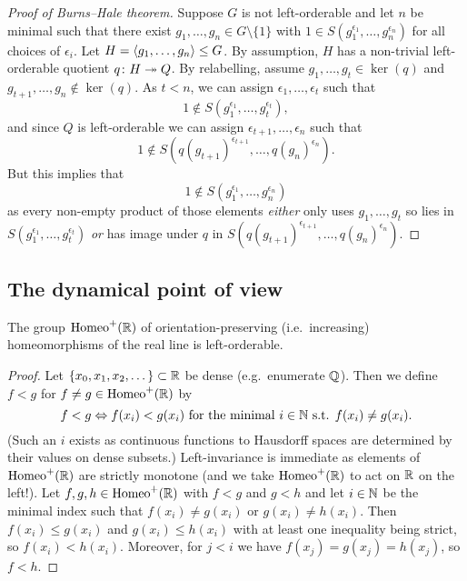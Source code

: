 \begin{proof}[Proof of Burns--Hale theorem]
    Suppose $G$ is not left-orderable and let $n$ be minimal such that there exist $g_1, \dots, g_n \in G \setminus \{1\}$ with $1 \in S(g_1^{\epsilon_1}, \dots, g_n^{\epsilon_n})$ for all choices of $\epsilon_i$.
    Let $H = \langle g_1, \dots, g_n \rangle \leq G$.
    By assumption, $H$ has a non-trivial left-orderable quotient $q \colon H \twoheadrightarrow Q$.
    By relabelling, assume $g_1, \dots, g_t \in \ker(q)$ and $g_{t+1}, \dots, g_n \notin \ker(q)$.
    As $t < n$, we can assign $\epsilon_1, \dots, \epsilon_t$ such that \[
        1 \notin S(g_1^{\epsilon_1}, \dots, g_t^{\epsilon_t}),
    \] and since $Q$ is left-orderable we can assign $\epsilon_{t+1}, \dots, \epsilon_n$ such that \[
        1 \notin S(q(g_{t+1})^{\epsilon_{t+1}}, \dots, q(g_n)^{\epsilon_n}).
    \]
    But this implies that \[
        1 \notin S(g_1^{\epsilon_1}, \dots, g_n^{\epsilon_n})
    \] as every non-empty product of those elements \emph{either} only uses $g_1, \dots, g_t$ so lies in $S(g_1^{\epsilon_1}, \dots, g_t^{\epsilon_t})$ \emph{or} has image under $q$ in $S(q(g_{t+1})^{\epsilon_{t+1}}, \dots, q(g_n)^{\epsilon_n})$.
\end{proof}

\subsection*{The dynamical point of view}

\begin{proposition}
    The group $\mathrm{Homeo}^+(\mathbb{R})$ of orientation-preserving (i.e.\ increasing) homeomorphisms of the real line is left-orderable.
\end{proposition}

\begin{proof}
    Let $\{x_0, x_1, x_2, \dots\} \subset \mathbb{R}$ be dense (e.g.\ enumerate $\mathbb{Q}$).
    Then we define $f < g$ for $f \neq g \in \mathrm{Homeo}^+(\mathbb{R})$ by \[
        f < g \Leftrightarrow f(x_i) < g(x_i) \text{ for the minimal } i \in \mathbb{N} \text{ s.t. } f(x_i) \neq g(x_i).
    \]
    (Such an $i$ exists as continuous functions to Hausdorff spaces are determined by their values on dense subsets.)
    Left-invariance is immediate as elements of $\mathrm{Homeo}^+(\mathbb{R})$ are strictly monotone (and we take $\mathrm{Homeo}^+(\mathbb{R})$ to act on $\mathbb{R}$ on the left!).
    Let $f, g, h \in \mathrm{Homeo}^+(\mathbb{R})$ with $f < g$ and $g < h$ and let $i \in \mathbb{N}$ be the minimal index such that $f(x_i) \neq g(x_i)$ or $g(x_i) \neq h(x_i)$.
    Then $f(x_i) \leq g(x_i)$ and $g(x_i) \leq h(x_i)$ with at least one inequality being strict, so $f(x_i) < h(x_i)$.
    Moreover, for $j < i$ we have $f(x_j) = g(x_j) = h(x_j)$, so $f < h$.
\end{proof}

